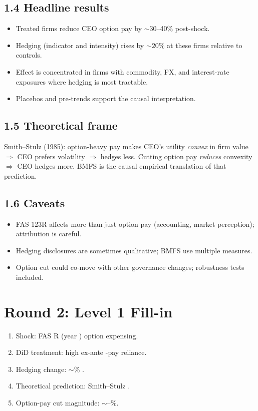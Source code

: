 \documentclass[11pt]{article}
\newcommand{\blank}[1]{\underline{\hspace{#1}}}
\begin{document}
\subsection*{1.4 Headline results}
\begin{itemize}
\item Treated firms reduce CEO option pay by $\sim$30--40\% post-shock.
\item Hedging (indicator and intensity) rises by $\sim 20\%$ at these firms relative to controls.
\item Effect is concentrated in firms with commodity, FX, and interest-rate exposures where hedging is most tractable.
\item Placebos and pre-trends support the causal interpretation.
\end{itemize}

\subsection*{1.5 Theoretical frame}
Smith--Stulz (1985): option-heavy pay makes CEO's utility \emph{convex} in firm value $\Rightarrow$ CEO prefers volatility $\Rightarrow$ hedges less. Cutting option pay \emph{reduces} convexity $\Rightarrow$ CEO hedges more. BMFS is the causal empirical translation of that prediction.

\subsection*{1.6 Caveats}
\begin{alertbox}
\begin{itemize}
\item FAS 123R affects more than just option pay (accounting, market perception); attribution is careful.
\item Hedging disclosures are sometimes qualitative; BMFS use multiple measures.
\item Option cut could co-move with other governance changes; robustness tests included.
\end{itemize}
\end{alertbox}

\section*{Round 2: Level 1 Fill-in}
\begin{enumerate}
\item Shock: FAS \blank{1cm}R (year \blank{1cm}) option expensing.
\item DiD treatment: high ex-ante \blank{1cm}-pay reliance.
\item Hedging change: $\sim$\blank{1cm}\% \blank{1cm}.
\item Theoretical prediction: Smith--Stulz \blank{1cm}.
\item Option-pay cut magnitude: $\sim$\blank{1cm}--\blank{1cm}\%.
\end{enumerate}
\end{document}
